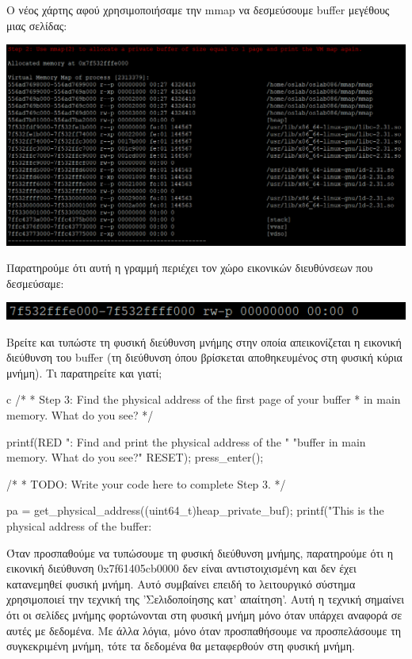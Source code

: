 \documentclass[12pt]{article}
\begin{document}
Ο νέος χάρτης αφού χρησιμοποιήσαμε την mmap να δεσμεύσουμε buffer μεγέθους μιας σελίδας:

\centerline{\includegraphics[width=1\textwidth]{3_1_2.png}}

Παρατηρούμε ότι αυτή η γραμμή περιέχει τον χώρο εικονικών διευθύνσεων που δεσμεύσαμε:

\includegraphics{3_1_2_all.png}


\begin{question}
Βρείτε και τυπώστε τη φυσική διεύθυνση μνήμης στην οποία απεικονίζεται η εικονική 
διεύθυνση του buffer (τη διεύθυνση όπου βρίσκεται αποθηκευμένος στη
φυσική κύρια μνήμη). Τι παρατηρείτε και γιατί;
\end{question}

\begin{codeless}{c}
/*
	 * Step 3: Find the physical address of the first page of your buffer
	 * in main memory. What do you see?
	 */

	printf(RED ": Find and print the physical address of the "
		"buffer in main memory. What do you see?\n" RESET);
	press_enter();

	/*
	 * TODO: Write your code here to complete Step 3.
	 */

	pa = get_physical_address((uint64_t)heap_private_buf);
	printf("This is the physical address of the buffer: %
\end{codeless}

Όταν προσπαθούμε να τυπώσουμε τη φυσική διεύθυνση μνήμης, παρατηρούμε ότι η εικονική 
διεύθυνση 0x7f61405cb0000 δεν είναι αντιστοιχισμένη και δεν έχει κατανεμηθεί φυσική 
μνήμη. 
Αυτό συμβαίνει επειδή το λειτουργικό σύστημα χρησιμοποιεί την τεχνική της 
'Σελιδοποίησης κατ' απαίτηση'. 
Αυτή η τεχνική σημαίνει ότι οι σελίδες μνήμης φορτώνονται στη φυσική μνήμη μόνο όταν 
υπάρχει αναφορά σε αυτές με δεδομένα. 
Με άλλα λόγια, μόνο όταν προσπαθήσουμε να προσπελάσουμε τη συγκεκριμένη μνήμη, τότε 
τα δεδομένα θα μεταφερθούν στη φυσική μνήμη.
\end{document}
